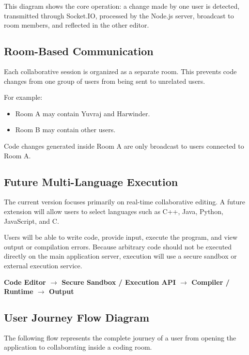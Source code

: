 \documentclass[11pt,letterpaper]{article}
\begin{document}
This diagram shows the core operation: a change made by one user is detected, transmitted through Socket.IO, processed by the Node.js server, broadcast to room members, and reflected in the other editor.

\subsection{Room-Based Communication}
Each collaborative session is organized as a separate room. This prevents code changes from one group of users from being sent to unrelated users.

For example:
\begin{itemize}
\item Room A may contain Yuvraj and Harwinder.
\item Room B may contain other users.
\end{itemize}

Code changes generated inside Room A are only broadcast to users connected to Room A.

\subsection{Future Multi-Language Execution}
The current version focuses primarily on real-time collaborative editing. A future extension will allow users to select languages such as C++, Java, Python, JavaScript, and C.

Users will be able to write code, provide input, execute the program, and view output or compilation errors. Because arbitrary code should not be executed directly on the main application server, execution will use a secure sandbox or external execution service.

\begin{center}
\textbf{Code Editor $\rightarrow$ Secure Sandbox / Execution API $\rightarrow$ Compiler / Runtime $\rightarrow$ Output}
\end{center}



\subsection{User Journey Flow Diagram}

The following flow represents the complete journey of a user from opening the application to collaborating inside a coding room.
\end{document}
